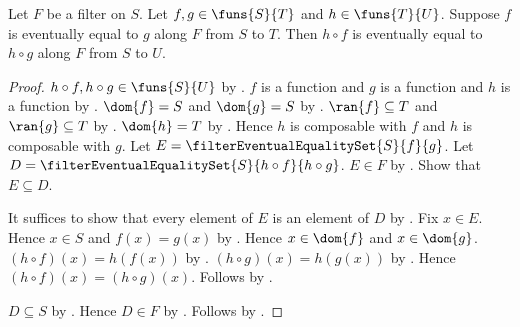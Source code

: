 \begin{proposition}\label{filter_eventually_equal_postcompose}
    Let $F$ be a filter on $S$.
    Let $f,g\in\funs{S}{T}$ and $h\in\funs{T}{U}$.
    Suppose $f$ is eventually equal to $g$ along $F$ from $S$ to $T$.
    Then $h\circ f$ is eventually equal to $h\circ g$ along $F$ from
        $S$ to $U$.
\end{proposition}
\begin{proof}
    $h\circ f,h\circ g\in\funs{S}{U}$ by .
    $f$ is a function and $g$ is a function and $h$ is a function by
        .
    $\dom{f}=S$ and $\dom{g}=S$ by .
    $\ran{f}\subseteq T$ and $\ran{g}\subseteq T$ by .
    $\dom{h}=T$ by .
    Hence $h$ is composable with $f$ and $h$ is composable with $g$.
    Let $E=\filterEventualEqualitySet{S}{f}{g}$.
    Let $D=\filterEventualEqualitySet{S}{h\circ f}{h\circ g}$.
    $E\in F$ by .
    Show that $E\subseteq D$.
    \begin{subproof}
        It suffices to show that every element of $E$ is an element of $D$
            by .
        Fix $x\in E$.
        Hence $x\in S$ and $f(x)=g(x)$ by
            .
        Hence $x\in\dom{f}$ and $x\in\dom{g}$.
        $(h\circ f)(x)=h(f(x))$ by .
        $(h\circ g)(x)=h(g(x))$ by .
        Hence $(h\circ f)(x)=(h\circ g)(x)$.
        Follows by .
    \end{subproof}
    $D\subseteq S$ by
        .
    Hence $D\in F$ by .
    Follows by .
\end{proof}

